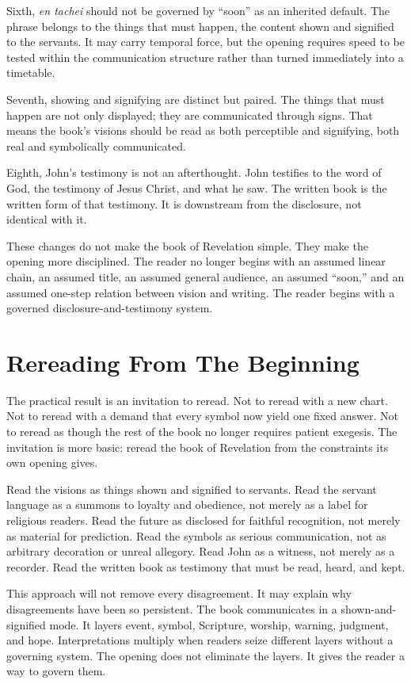 Sixth, \textit{en tachei} should not be governed by ``soon'' as an inherited default. The phrase belongs to the things that must happen, the content shown and signified to the servants. It may carry temporal force, but the opening requires speed to be tested within the communication structure rather than turned immediately into a timetable.

Seventh, showing and signifying are distinct but paired. The things that must happen are not only displayed; they are communicated through signs. That means the book's visions should be read as both perceptible and signifying, both real and symbolically communicated.

Eighth, John's testimony is not an afterthought. John testifies to the word of God, the testimony of Jesus Christ, and what he saw. The written book is the written form of that testimony. It is downstream from the disclosure, not identical with it.

These changes do not make the book of Revelation simple. They make the opening more disciplined. The reader no longer begins with an assumed linear chain, an assumed title, an assumed general audience, an assumed ``soon,'' and an assumed one-step relation between vision and writing. The reader begins with a governed disclosure-and-testimony system.

\section{Rereading From The Beginning}

The practical result is an invitation to reread. Not to reread with a new chart. Not to reread with a demand that every symbol now yield one fixed answer. Not to reread as though the rest of the book no longer requires patient exegesis. The invitation is more basic: reread the book of Revelation from the constraints its own opening gives.

Read the visions as things shown and signified to servants. Read the servant language as a summons to loyalty and obedience, not merely as a label for religious readers. Read the future as disclosed for faithful recognition, not merely as material for prediction. Read the symbols as serious communication, not as arbitrary decoration or unreal allegory. Read John as a witness, not merely as a recorder. Read the written book as testimony that must be read, heard, and kept.

This approach will not remove every disagreement. It may explain why disagreements have been so persistent. The book communicates in a shown-and-signified mode. It layers event, symbol, Scripture, worship, warning, judgment, and hope. Interpretations multiply when readers seize different layers without a governing system. The opening does not eliminate the layers. It gives the reader a way to govern them.

